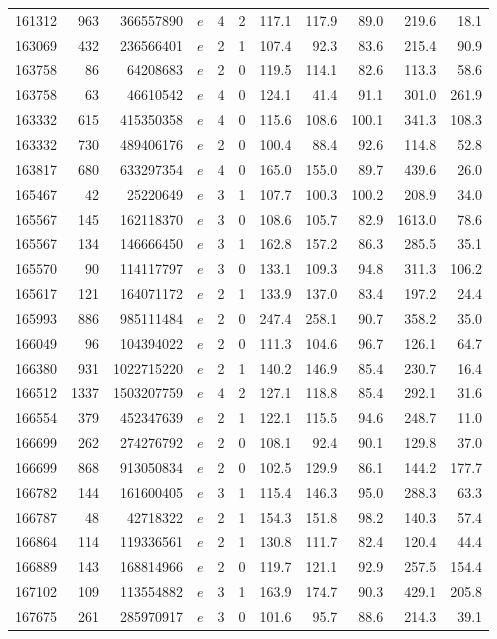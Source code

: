 \begin{table}[htb]
\begin{center}
\begin{tabular}{rrrrrrrrrrr}
161312 & 963 &  366557890 &    $e$ & 4 & 2 & 117.1 & 117.9 &  89.0 & 219.6 &  18.1\\
163069 & 432 &  236566401 &    $e$ & 2 & 1 & 107.4 &  92.3 &  83.6 & 215.4 &  90.9\\
163758 &  86 &   64208683 &    $e$ & 2 & 0 & 119.5 & 114.1 &  82.6 & 113.3 &  58.6\\
163758 &  63 &   46610542 &    $e$ & 4 & 0 & 124.1 &  41.4 &  91.1 & 301.0 & 261.9\\
163332 & 615 &  415350358 &    $e$ & 4 & 0 & 115.6 & 108.6 & 100.1 & 341.3 & 108.3\\
163332 & 730 &  489406176 &    $e$ & 2 & 0 & 100.4 &  88.4 &  92.6 & 114.8 &  52.8\\
163817 & 680 &  633297354 &    $e$ & 4 & 0 & 165.0 & 155.0 &  89.7 & 439.6 &  26.0\\
165467 &  42 &   25220649 &    $e$ & 3 & 1 & 107.7 & 100.3 & 100.2 & 208.9 &  34.0\\
165567 & 145 &  162118370 &    $e$ & 3 & 0 & 108.6 & 105.7 &  82.9 & 1613.0 &  78.6\\
165567 & 134 &  146666450 &    $e$ & 3 & 1 & 162.8 & 157.2 &  86.3 & 285.5 &  35.1\\
165570 &  90 &  114117797 &    $e$ & 3 & 0 & 133.1 & 109.3 &  94.8 & 311.3 & 106.2\\
165617 & 121 &  164071172 &    $e$ & 2 & 1 & 133.9 & 137.0 &  83.4 & 197.2 &  24.4\\
165993 & 886 &  985111484 &    $e$ & 2 & 0 & 247.4 & 258.1 &  90.7 & 358.2 &  35.0\\
166049 &  96 &  104394022 &    $e$ & 2 & 0 & 111.3 & 104.6 &  96.7 & 126.1 &  64.7\\
166380 & 931 & 1022715220 &    $e$ & 2 & 1 & 140.2 & 146.9 &  85.4 & 230.7 &  16.4\\
166512 & 1337 & 1503207759 &    $e$ & 4 & 2 & 127.1 & 118.8 &  85.4 & 292.1 &  31.6\\
166554 & 379 &  452347639 &    $e$ & 2 & 1 & 122.1 & 115.5 &  94.6 & 248.7 &  11.0\\
166699 & 262 &  274276792 &    $e$ & 2 & 0 & 108.1 &  92.4 &  90.1 & 129.8 &  37.0\\
166699 & 868 &  913050834 &    $e$ & 2 & 0 & 102.5 & 129.9 &  86.1 & 144.2 & 177.7\\
166782 & 144 &  161600405 &    $e$ & 3 & 1 & 115.4 & 146.3 &  95.0 & 288.3 &  63.3\\
166787 &  48 &   42718322 &    $e$ & 2 & 1 & 154.3 & 151.8 &  98.2 & 140.3 &  57.4\\
166864 & 114 &  119336561 &    $e$ & 2 & 1 & 130.8 & 111.7 &  82.4 & 120.4 &  44.4\\
166889 & 143 &  168814966 &    $e$ & 2 & 0 & 119.7 & 121.1 &  92.9 & 257.5 & 154.4\\
167102 & 109 &  113554882 &    $e$ & 3 & 1 & 163.9 & 174.7 &  90.3 & 429.1 & 205.8\\
167675 & 261 &  285970917 &    $e$ & 3 & 0 & 101.6 &  95.7 &  88.6 & 214.3 &  39.1\\


\end{tabular}
\end{center}
\end{table}

